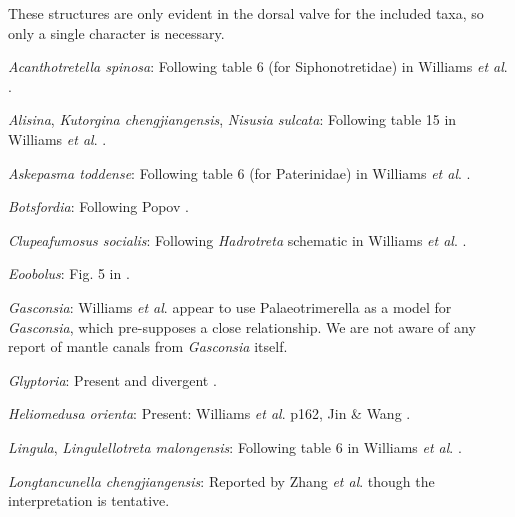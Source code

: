 \documentclass[openany]{book}
\theoremstyle{definition}
\theoremstyle{definition}
\theoremstyle{definition}
\theoremstyle{remark}
\begin{document}
These structures are only evident in the dorsal valve for the included
taxa, so only a single character is necessary.

\hypertarget{Acanthotretella_spinosa-coding-27}{}
\emph{Acanthotretella spinosa}: Following table 6 (for Siphonotretidae)
in Williams \emph{et al}.
\citeyearpar{Williams2000LinguliformeaCraniiformea}.

\hypertarget{Alisina-coding-27}{}
\emph{Alisina}, \emph{Kutorgina chengjiangensis}, \emph{Nisusia
sulcata}: Following table 15 in Williams \emph{et al}.
\citeyearpar{Williams2000LinguliformeaCraniiformea}.

\hypertarget{Askepasma_toddense-coding-27}{}
\emph{Askepasma toddense}: Following table 6 (for Paterinidae) in
Williams \emph{et al}.
\citeyearpar{Williams2000LinguliformeaCraniiformea}.

\hypertarget{Botsfordia-coding-27}{}
\emph{Botsfordia}: Following Popov \citeyearpar[fig.
2]{Popov1992TheCambrian}.

\hypertarget{Clupeafumosus_socialis-coding-27}{}
\emph{Clupeafumosus socialis}: Following \emph{Hadrotreta} schematic in
Williams \emph{et al}.
\citeyearpar{Williams2000LinguliformeaCraniiformea}.

\hypertarget{Eoobolus-coding-27}{}
\emph{Eoobolus}: Fig. 5 in \citet{Balthasar2009Thebrachiopod}.

\hypertarget{Gasconsia-coding-27}{}
\emph{Gasconsia}: Williams \emph{et al}. \citeyearpar[table
15]{Williams2000LinguliformeaCraniiformea} appear to use
Palaeotrimerella \citep[as drawn in][]{Williams1997Introduction} as a
model for \emph{Gasconsia}, which pre-supposes a close relationship. We
are not aware of any report of mantle canals from \emph{Gasconsia}
itself.

\hypertarget{Glyptoria-coding-27}{}
\emph{Glyptoria}: Present and divergent
\citep{Williams2000LinguliformeaCraniiformea}.

\hypertarget{Heliomedusa_orienta-coding-27}{}
\emph{Heliomedusa orienta}: Present: Williams \emph{et al}.
\citeyearpar{Williams2000LinguliformeaCraniiformea} p162, Jin \& Wang
\citeyearpar{Jin1992Revisionof}.

\hypertarget{Lingula-coding-27}{}
\emph{Lingula}, \emph{Lingulellotreta malongensis}: Following table 6 in
Williams \emph{et al}.
\citeyearpar{Williams2000LinguliformeaCraniiformea}.

\hypertarget{Longtancunella_chengjiangensis-coding-27}{}
\emph{Longtancunella chengjiangensis}: Reported by Zhang \emph{et al}.
\citeyearpar{Zhang2007Agregarious} though the interpretation is
tentative.
\end{document}
